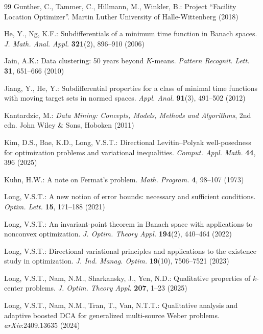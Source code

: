 \documentclass[sn-mathphys-num]{sn-jnl}%
\theoremstyle{definition}
\begin{document}
\begin{thebibliography}{99}
		Gunther, C., Tammer, C., Hillmann, M., Winkler, B.:
		Project ``Facility Location Optimizer''.
		Martin Luther University of Halle-Wittenberg (2018)
		
		He, Y., Ng, K.F.:
		Subdifferentials of a minimum time function in Banach spaces.
		\textit{J. Math. Anal. Appl.} \textbf{321}(2), 896--910 (2006)
		
		Jain, A.K.:
		Data clustering: 50 years beyond $K$-means.
		\textit{Pattern Recognit. Lett.} \textbf{31}, 651--666 (2010)

		Jiang, Y., He, Y.:
		Subdifferential properties for a class of minimal time functions with moving target sets in normed spaces.
		\textit{Appl. Anal.} \textbf{91}(3), 491--502 (2012)
		
		Kantardzic, M.:
		\textit{Data Mining: Concepts, Models, Methods and Algorithms}, 2nd edn.
		John Wiley \& Sons, Hoboken (2011)
		
		Kim, D.S., Bae, K.D., Long, V.S.T.:
		Directional Levitin--Polyak well-posedness for optimization problems and variational inequalities.
		\textit{Comput. Appl. Math.} \textbf{44}, 396 (2025)


		
		Kuhn, H.W.:
		A note on Fermat's problem.
		\textit{Math. Program.} \textbf{4}, 98--107 (1973)
		
		Long, V.S.T.:
		A new notion of error bounds: necessary and sufficient conditions.
		\textit{Optim. Lett.} \textbf{15}, 171--188 (2021)
		
		Long, V.S.T.:
		An invariant-point theorem in Banach space with applications to nonconvex optimization.
		\textit{J. Optim. Theory Appl.} \textbf{194}(2), 440--464 (2022)
		
		Long, V.S.T.:
		Directional variational principles and applications to the existence study in optimization.
		\textit{J. Ind. Manag. Optim.} \textbf{19}(10), 7506--7521 (2023)
		
		Long, V.S.T., Nam, N.M., Sharkansky, J., Yen, N.D.:
		Qualitative properties of $k$-center problems.
		\textit{J. Optim. Theory Appl.} \textbf{207}, 1--23 (2025)
		
		Long, V.S.T., Nam, N.M., Tran, T., Van, N.T.T.:
		Qualitative analysis and adaptive boosted DCA for generalized multi-source Weber problems.
		\textit{arXiv}:2409.13635 (2024)
		

\end{thebibliography}
\end{document}
